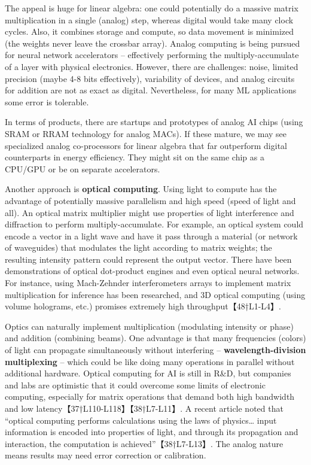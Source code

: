 The appeal is huge for linear algebra: one could potentially do a massive matrix multiplication in a single (analog) step, whereas digital would take many clock cycles. Also, it combines storage and compute, so data movement is minimized (the weights never leave the crossbar array). Analog computing is being pursued for neural network accelerators – effectively performing the multiply-accumulate of a layer with physical electronics. However, there are challenges: noise, limited precision (maybe 4-8 bits effectively), variability of devices, and analog circuits for addition are not as exact as digital. Nevertheless, for many ML applications some error is tolerable.

In terms of products, there are startups and prototypes of analog AI chips (using SRAM or RRAM technology for analog MACs). If these mature, we may see specialized analog co-processors for linear algebra that far outperform digital counterparts in energy efficiency. They might sit on the same chip as a CPU/GPU or be on separate accelerators.

Another approach is \textbf{optical computing}. Using light to compute has the advantage of potentially massive parallelism and high speed (speed of light and all). An optical matrix multiplier might use properties of light interference and diffraction to perform multiply-accumulate. For example, an optical system could encode a vector in a light wave and have it pass through a material (or network of waveguides) that modulates the light according to matrix weights; the resulting intensity pattern could represent the output vector. There have been demonstrations of optical dot-product engines and even optical neural networks. For instance, using Mach-Zehnder interferometers arrays to implement matrix multiplication for inference has been researched, and 3D optical computing (using volume holograms, etc.) promises extremely high throughput【48†L1-L4】.

Optics can naturally implement multiplication (modulating intensity or phase) and addition (combining beams). One advantage is that many frequencies (colors) of light can propagate simultaneously without interfering – \textbf{wavelength-division multiplexing} – which could be like doing many operations in parallel without additional hardware. Optical computing for AI is still in R\&D, but companies and labs are optimistic that it could overcome some limits of electronic computing, especially for matrix operations that demand both high bandwidth and low latency【37†L110-L118】【38†L7-L11】. A recent article noted that “optical computing performs calculations using the laws of physics… input information is encoded into properties of light, and through its propagation and interaction, the computation is achieved”【38†L7-L13】. The analog nature means results may need error correction or calibration.

